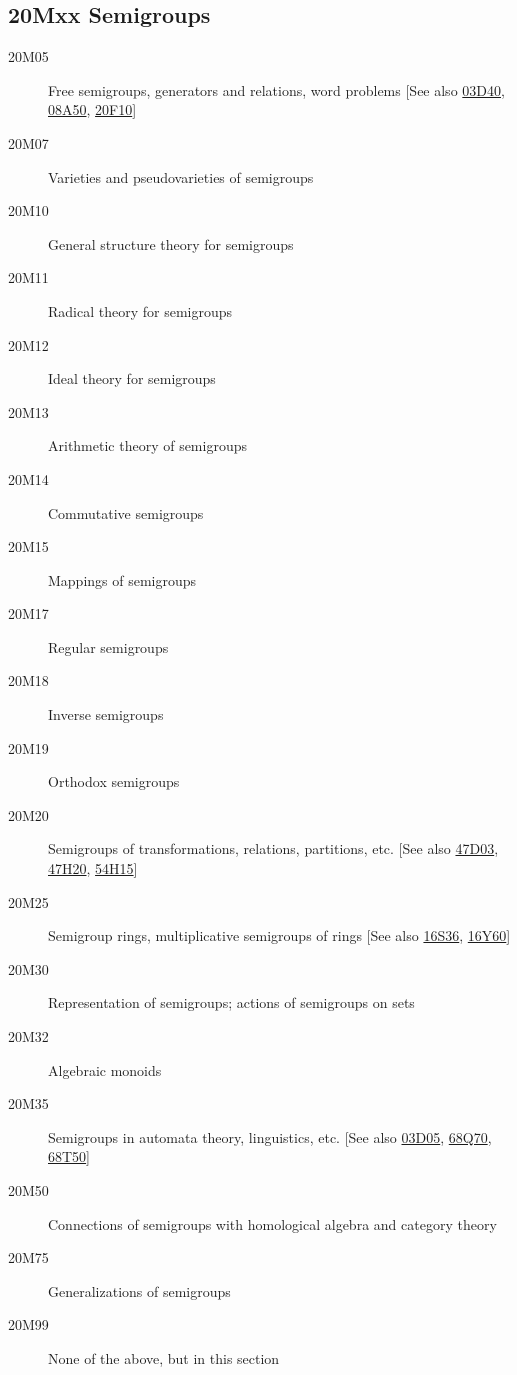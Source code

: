\subsection*{20Mxx  Semigroups }\label{20Mxx}
\begin{description}  
\item [20M05]\label{20M05} Free semigroups, generators and relations, word problems [See also \hyperref[03D40]{03D40}, \hyperref[08A50]{08A50}, \hyperref[20F10]{20F10}]
\item [20M07]\label{20M07} Varieties and pseudovarieties of semigroups
\item [20M10]\label{20M10} General structure theory for semigroups
\item [20M11]\label{20M11} Radical theory for semigroups
\item [20M12]\label{20M12} Ideal theory for semigroups
\item [20M13]\label{20M13} Arithmetic theory of semigroups
\item [20M14]\label{20M14} Commutative semigroups
\item [20M15]\label{20M15} Mappings of semigroups
\item [20M17]\label{20M17} Regular semigroups
\item [20M18]\label{20M18} Inverse semigroups
\item [20M19]\label{20M19} Orthodox semigroups
\item [20M20]\label{20M20} Semigroups of transformations, relations, partitions, etc. [See also \hyperref[47D03]{47D03}, \hyperref[47H20]{47H20}, \hyperref[54H15]{54H15}]
\item [20M25]\label{20M25} Semigroup rings, multiplicative semigroups of rings [See also \hyperref[16S36]{16S36}, \hyperref[16Y60]{16Y60}]
\item [20M30]\label{20M30} Representation of semigroups; actions of semigroups on sets
\item [20M32]\label{20M32} Algebraic monoids
\item [20M35]\label{20M35} Semigroups in automata theory, linguistics, etc. [See also \hyperref[03D05]{03D05}, \hyperref[68Q70]{68Q70}, \hyperref[68T50]{68T50}]
\item [20M50]\label{20M50} Connections of semigroups with homological algebra and category theory
\item [20M75]\label{20M75} Generalizations of semigroups
\item [20M99]\label{20M99} None of the above, but in this section
\end{description}
